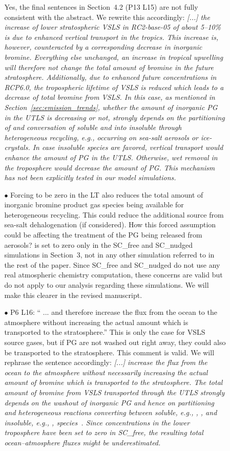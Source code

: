 \begin{itemize}
\begin{itemize}
\begin{itemize}
    Yes, the final sentences in Section~4.2 (P13 L15) are not fully consistent with the abstract. We rewrite this accordingly: \emph{[...] the increase of lower stratospheric VSLS in RC2-base-05 of about 5--10\% is due to enhanced vertical transport in the tropics. This increase is, however, counteracted by a corresponding decrease in inorganic bromine. Everything else unchanged, an increase in tropical upwelling will therefore not change the total amount of bromine in the future stratosphere. Additionally, due to enhanced future  concentrations in RCP6.0, the tropospheric lifetime of VSLS is reduced which leads to a decrease of total bromine from VSLS. In this case, as mentioned in Section~\ref{sec:emission_trends}, whether the amount of inorganic PG in the UTLS is decreasing or not, strongly depends on the partitioning of  and conversation of soluble  and  into insoluble  through heterogeneous recycling, e.g., occurring on sea-salt aerosols or ice-crystals. In case insoluble species are favored, vertical transport would enhance the amount of PG in the UTLS. Otherwise, wet removal in the troposphere would decrease the amount of PG. This mechanism has not been explicitly tested in our model simulations.}
  \item[$\bullet$]{\color{blue}Forcing  to be zero in the LT also reduces the total amount of inorganic bromine product gas species being available for heterogeneous recycling. This could reduce the additional source from sea-salt dehalogenation (if considered). How this forced  assumption could be affecting the treatment of the PG being released from aerosols?}
      is set to zero only in the SC\_free and SC\_nudged simulations in Section~3, not in any other simulation referred to in the rest of the paper. Since SC\_free and SC\_nudged do not use any real atmospheric chemistry computation, these concerns are valid but do not apply to our analysis regarding these simulations. We will make this clearer in the revised manuscript.
   \item[$\bullet$]{\color{blue}P6 L16: `` ... and therefore increase the flux from the ocean to the atmosphere without increasing the actual amount which is transported to the stratosphere.'' This is only the case for VSLS source gases, but if PG are not washed out right away, they could also be transported to the stratosphere.}
     This comment is valid. We will rephrase the sentence accordingly: \emph{[...] increase the flux from the ocean to the atmosphere without necessarily increasing the actual amount of bromine which is transported to the stratosphere. The total amount of bromine from VSLS transported through the UTLS strongly depends on the washout of inorganic PG and hence on partitioning and heterogeneous reactions converting  between soluble, e.g., , , and insoluble, e.g., , species~\citep[e.g.][]{ACP:Aschmann2009,ACP:Liang2014}. Since  concentrations in the lower troposphere have been set to zero in SC\_free, the resulting total ocean--atmosphere fluxes might be underestimated.}

\end{itemize}
\end{itemize}
\end{itemize}
